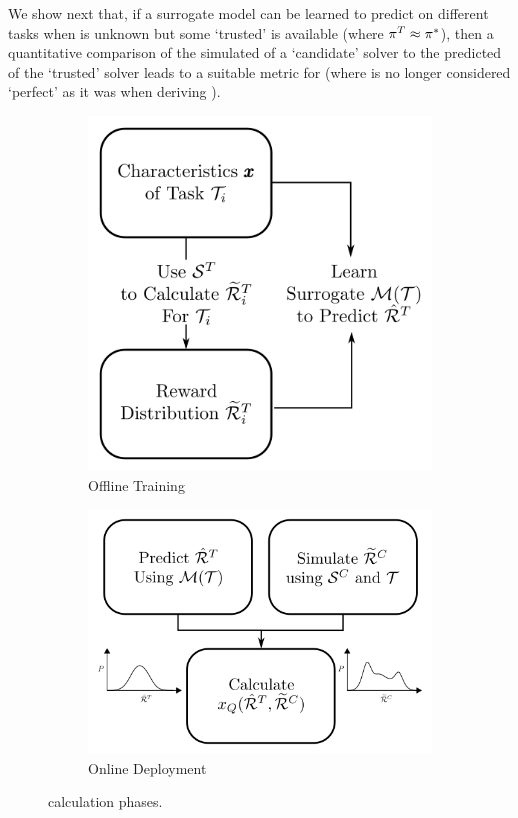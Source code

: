 We show next that, if a surrogate model can be learned to predict \rwdtrust{} on different tasks when \piopt{} is unknown but some `trusted' \pitrust{} is available (where $\pi^T \approx \pi^*$), then a quantitative comparison of the simulated \rwdcandsim{} of a `candidate' solver to the predicted \rwdtrustpredict{} of the `trusted' solver leads to a suitable metric for \xQ{} (where \xQ{} is no longer considered `perfect' as it was when deriving \xO).
\begin{figure}[tbp]
    \centering
    \begin{subfigure}[b]{0.50\linewidth}
        \centering
        \includegraphics[width=0.75\linewidth]{Figures/xQ_train.png}
        \vfill
        \caption{Offline Training}
        \label{fig:xQ_train}
    \end{subfigure}%
    \hfill
    \begin{subfigure}[b]{0.50\linewidth}
        \centering
        \includegraphics[width=0.75\linewidth]{Figures/xQ_test.png}
        \vspace{0.5cm}
        \caption{Online Deployment}
        \label{fig:sQ_test}
    \end{subfigure} 
    \caption{\xQ{} calculation phases.}
    \label{fig:xQ_test_train}
    \vspace{-0.5cm}
\end{figure}

